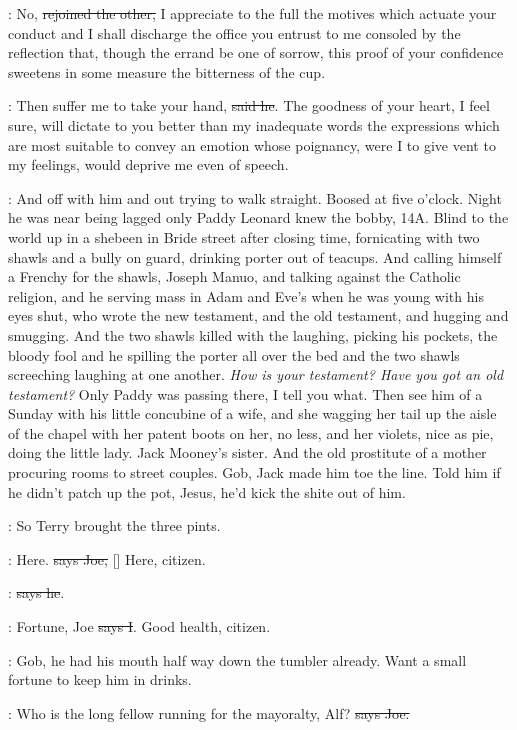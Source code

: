 \Bloom:
No, \sout{rejoined the other,}
I appreciate to the full the motives which
actuate your conduct and I shall discharge the office you entrust
to me consoled by the reflection that, though the errand be one of
sorrow, this proof of your confidence sweetens in some measure the
bitterness of the cup.

\doran:
Then suffer me to take your hand, \sout{said he}.
The goodness of your heart, I
feel sure, will dictate to you better than my inadequate words the
expressions which are most suitable to convey an emotion whose
poignancy, were I to give vent to my feelings, would deprive me even of
speech.

\Nq:
And off with him and out trying to walk straight.
Boosed at five
o'clock. Night he was near being lagged only Paddy Leonard knew the bobby,
14A. Blind to the world up in a shebeen in Bride street after closing
time, fornicating with two shawls and a bully on guard, drinking porter
out of teacups. And calling himself a Frenchy for the shawls, Joseph
Manuo, and talking against the Catholic religion, and he serving mass in
Adam and Eve's when he was young with his eyes shut, who wrote the new
testament, and the old testament, and hugging and smugging. And the two
shawls killed with the laughing, picking his pockets, the bloody
fool and he spilling the porter all over the bed and the two shawls
screeching laughing at one another.
\emph{How is your testament? Have you
got an old testament?} Only Paddy was passing there, I tell you what.
Then see him of a Sunday with his little concubine of a wife, and
she wagging her tail up the aisle of the chapel with her patent boots
on her, no less, and her violets, nice as pie, doing the little lady.
Jack Mooney's sister. And the old prostitute of a mother
procuring rooms to street couples. Gob, Jack made him toe the line. Told
him if he didn't patch up the pot, Jesus, he'd kick the shite out of him.

\Nq:
So Terry brought the three pints.

\joe:
Here. \sout{says Joe,}
[] Here, citizen.

\citizen:
 \sout{says he}.

:
Fortune, Joe \sout{says I}.
Good health, citizen.

\Nq:
Gob, he had his mouth half way down the tumbler already. Want a
small fortune to keep him in drinks.

\joe:
Who is the long fellow running for the mayoralty,
Alf? \sout{says Joe.}

